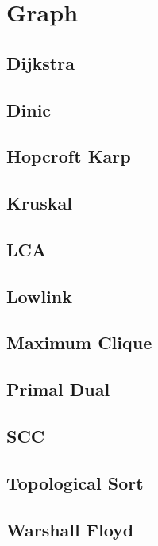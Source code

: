 \section{Graph}


\subsection{Dijkstra}


\subsection{Dinic}


\subsection{Hopcroft Karp}


\subsection{Kruskal}


\subsection{LCA}


\subsection{Lowlink}


\subsection{Maximum Clique}


\subsection{Primal Dual}


\subsection{SCC}


\subsection{Topological Sort}


\subsection{Warshall Floyd}

